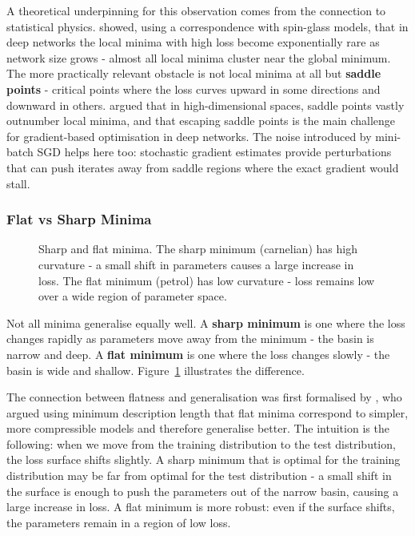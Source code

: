 A theoretical underpinning for this observation comes from the connection to statistical physics. \textcite{Choromanska2015} showed, using a correspondence with spin-glass models, that in deep networks the local minima with high loss become exponentially rare as network size grows - almost all local minima cluster near the global minimum. The more practically relevant obstacle is not local minima at all but \textbf{saddle points} - critical points where the loss curves upward in some directions and downward in others. \textcite{Dauphin2014} argued that in high-dimensional spaces, saddle points vastly outnumber local minima, and that escaping saddle points is the main challenge for gradient-based optimisation in deep networks. The noise introduced by mini-batch SGD helps here too: stochastic gradient estimates provide perturbations that can push iterates away from saddle regions where the exact gradient would stall.

\subsubsection{Flat vs Sharp Minima}\label{sec:gd_landscape}

\begin{figure}
\centering
{}
\resizebox{0.36\textwidth}{!}{}
\caption{Sharp and flat minima. The sharp minimum (carnelian) has high curvature - a small shift in parameters causes a large increase in loss. The flat minimum (petrol) has low curvature - loss remains low over a wide region of parameter space.}
\label{fig:flat_sharp}
\end{figure}

Not all minima generalise equally well. A \textbf{sharp minimum} is one where the loss changes rapidly as parameters move away from the minimum - the basin is narrow and deep. A \textbf{flat minimum} is one where the loss changes slowly - the basin is wide and shallow. Figure~\ref{fig:flat_sharp} illustrates the difference.

The connection between flatness and generalisation was first formalised by \textcite{Hochreiter1997}, who argued using minimum description length that flat minima correspond to simpler, more compressible models and therefore generalise better. The intuition is the following: when we move from the training distribution to the test distribution, the loss surface shifts slightly. A sharp minimum that is optimal for the training distribution may be far from optimal for the test distribution - a small shift in the surface is enough to push the parameters out of the narrow basin, causing a large increase in loss. A flat minimum is more robust: even if the surface shifts, the parameters remain in a region of low loss.

